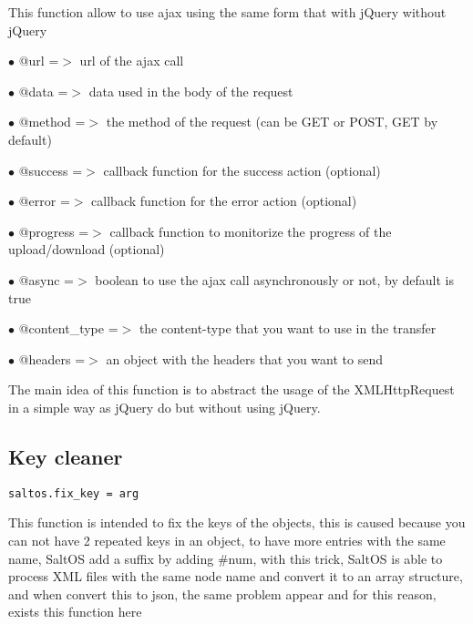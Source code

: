 \documentclass[a4paper]{book}
\begin{document}
This function allow to use ajax using the same form that with jQuery without jQuery

\begin{compactitem}
\item[\color{myblue}$\bullet$] @url          =$>$ url of the ajax call
\item[\color{myblue}$\bullet$] @data         =$>$ data used in the body of the request
\item[\color{myblue}$\bullet$] @method       =$>$ the method of the request (can be GET or POST, GET by default)
\item[\color{myblue}$\bullet$] @success      =$>$ callback function for the success action (optional)
\item[\color{myblue}$\bullet$] @error        =$>$ callback function for the error action (optional)
\item[\color{myblue}$\bullet$] @progress     =$>$ callback function to monitorize the progress of the upload/download (optional)
\item[\color{myblue}$\bullet$] @async        =$>$ boolean to use the ajax call asynchronously or not, by default is true
\item[\color{myblue}$\bullet$] @content\_type =$>$ the content-type that you want to use in the transfer
\item[\color{myblue}$\bullet$] @headers      =$>$ an object with the headers that you want to send
\end{compactitem}

The main idea of this function is to abstract the usage of the XMLHttpRequest in a simple
way as jQuery do but without using jQuery.

\hypertarget{toc427}{}
\subsection{Key cleaner}

\begin{lstlisting}
saltos.fix_key = arg
\end{lstlisting}

This function is intended to fix the keys of the objects, this is caused because you can not
have 2 repeated keys in an object, to have more entries with the same name, SaltOS add a suffix
by adding \#num, with this trick, SaltOS is able to process XML files with the same node name
and convert it to an array structure, and when convert this to json, the same problem appear and
for this reason, exists this function here
\end{document}
